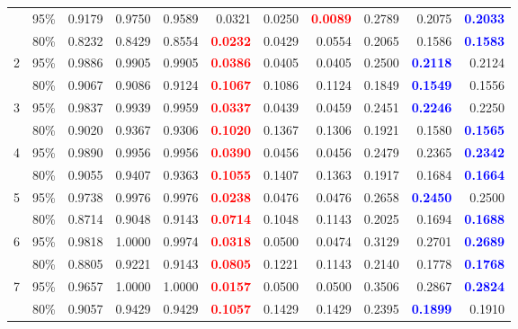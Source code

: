 \begin{longtable}[c]{ccrrrrrrrrr}
\endfoot
\bottomrule
\endlastfoot
1 & 95\% & 0.9179 & 0.9750 & 0.9589 & 0.0321 & 0.0250 & \textcolor{red}{\textbf{0.0089}} & 0.2789 & 0.2075 & \textcolor{blue}{\textbf{0.2033}} \\
 & 80\% & 0.8232 & 0.8429 & 0.8554 & \textcolor{red}{\textbf{0.0232}} & 0.0429 & 0.0554 & 0.2065 & 0.1586 & \textcolor{blue}{\textbf{0.1583}} \\
\cmidrule(lr){1-11}
2 & 95\% & 0.9886 & 0.9905 & 0.9905 & \textcolor{red}{\textbf{0.0386}} & 0.0405 & 0.0405 & 0.2500 & \textcolor{blue}{\textbf{0.2118}} & 0.2124 \\
 & 80\% & 0.9067 & 0.9086 & 0.9124 & \textcolor{red}{\textbf{0.1067}} & 0.1086 & 0.1124 & 0.1849 & \textcolor{blue}{\textbf{0.1549}} & 0.1556 \\
\cmidrule(lr){1-11}
3 & 95\% & 0.9837 & 0.9939 & 0.9959 & \textcolor{red}{\textbf{0.0337}} & 0.0439 & 0.0459 & 0.2451 & \textcolor{blue}{\textbf{0.2246}} & 0.2250 \\
 & 80\% & 0.9020 & 0.9367 & 0.9306 & \textcolor{red}{\textbf{0.1020}} & 0.1367 & 0.1306 & 0.1921 & 0.1580 & \textcolor{blue}{\textbf{0.1565}} \\
\cmidrule(lr){1-11}
4 & 95\% & 0.9890 & 0.9956 & 0.9956 & \textcolor{red}{\textbf{0.0390}} & 0.0456 & 0.0456 & 0.2479 & 0.2365 & \textcolor{blue}{\textbf{0.2342}} \\
 & 80\% & 0.9055 & 0.9407 & 0.9363 & \textcolor{red}{\textbf{0.1055}} & 0.1407 & 0.1363 & 0.1917 & 0.1684 & \textcolor{blue}{\textbf{0.1664}} \\
\cmidrule(lr){1-11}
5 & 95\% & 0.9738 & 0.9976 & 0.9976 & \textcolor{red}{\textbf{0.0238}} & 0.0476 & 0.0476 & 0.2658 & \textcolor{blue}{\textbf{0.2450}} & 0.2500 \\
 & 80\% & 0.8714 & 0.9048 & 0.9143 & \textcolor{red}{\textbf{0.0714}} & 0.1048 & 0.1143 & 0.2025 & 0.1694 & \textcolor{blue}{\textbf{0.1688}} \\
\cmidrule(lr){1-11}
6 & 95\% & 0.9818 & 1.0000 & 0.9974 & \textcolor{red}{\textbf{0.0318}} & 0.0500 & 0.0474 & 0.3129 & 0.2701 & \textcolor{blue}{\textbf{0.2689}} \\
 & 80\% & 0.8805 & 0.9221 & 0.9143 & \textcolor{red}{\textbf{0.0805}} & 0.1221 & 0.1143 & 0.2140 & 0.1778 & \textcolor{blue}{\textbf{0.1768}} \\
\cmidrule(lr){1-11}
7 & 95\% & 0.9657 & 1.0000 & 1.0000 & \textcolor{red}{\textbf{0.0157}} & 0.0500 & 0.0500 & 0.3506 & 0.2867 & \textcolor{blue}{\textbf{0.2824}} \\
 & 80\% & 0.9057 & 0.9429 & 0.9429 & \textcolor{red}{\textbf{0.1057}} & 0.1429 & 0.1429 & 0.2395 & \textcolor{blue}{\textbf{0.1899}} & 0.1910 \\

\end{longtable}
